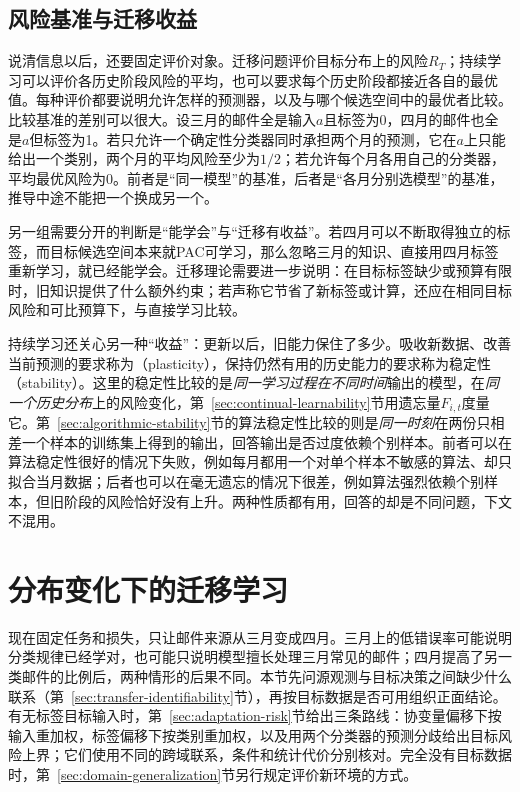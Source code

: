 \subsection{风险基准与迁移收益}
\label{sec:transfer-risk-benchmarks}

说清信息以后，还要固定评价对象。迁移问题评价目标分布上的风险$R_T$；持续学习可以评价各历史阶段风险的平均，也可以要求每个历史阶段都接近各自的最优值。每种评价都要说明允许怎样的预测器，以及与哪个候选空间中的最优者比较。比较基准的差别可以很大。设三月的邮件全是输入$a$且标签为0，四月的邮件也全是$a$但标签为1。若只允许一个确定性分类器同时承担两个月的预测，它在$a$上只能给出一个类别，两个月的平均风险至少为$1/2$；若允许每个月各用自己的分类器，平均最优风险为0。前者是“同一模型”的基准，后者是“各月分别选模型”的基准，推导中途不能把一个换成另一个。

另一组需要分开的判断是“能学会”与“迁移有收益”。若四月可以不断取得独立的标签，而目标候选空间本来就PAC可学习，那么忽略三月的知识、直接用四月标签重新学习，就已经能学会。迁移理论需要进一步说明：在目标标签缺少或预算有限时，旧知识提供了什么额外约束；若声称它节省了新标签或计算，还应在相同目标风险和可比预算下，与直接学习比较。

持续学习还关心另一种“收益”：更新以后，旧能力保住了多少。吸收新数据、改善当前预测的要求称为（plasticity），保持仍然有用的历史能力的要求称为稳定性（stability）。这里的稳定性比较的是\emph{同一学习过程在不同时间}输出的模型，在\emph{同一个历史分布}上的风险变化，第~\ref{sec:continual-learnability}节用遗忘量$F_{i,t}$度量它。第~\ref{sec:algorithmic-stability}节的算法稳定性比较的则是\emph{同一时刻}在两份只相差一个样本的训练集上得到的输出，回答输出是否过度依赖个别样本。前者可以在算法稳定性很好的情况下失败，例如每月都用一个对单个样本不敏感的算法、却只拟合当月数据；后者也可以在毫无遗忘的情况下很差，例如算法强烈依赖个别样本，但旧阶段的风险恰好没有上升。两种性质都有用，回答的却是不同问题，下文不混用。
\section{分布变化下的迁移学习}
\label{sec:domain-adaptation}

现在固定任务和损失，只让邮件来源从三月变成四月。三月上的低错误率可能说明分类规律已经学对，也可能只说明模型擅长处理三月常见的邮件；四月提高了另一类邮件的比例后，两种情形的后果不同。本节先问源观测与目标决策之间缺少什么联系（第~\ref{sec:transfer-identifiability}节），再按目标数据是否可用组织正面结论。有无标签目标输入时，第~\ref{sec:adaptation-risk}节给出三条路线：协变量偏移下按输入重加权，标签偏移下按类别重加权，以及用两个分类器的预测分歧给出目标风险上界；它们使用不同的跨域联系，条件和统计代价分别核对。完全没有目标数据时，第~\ref{sec:domain-generalization}节另行规定评价新环境的方式。

